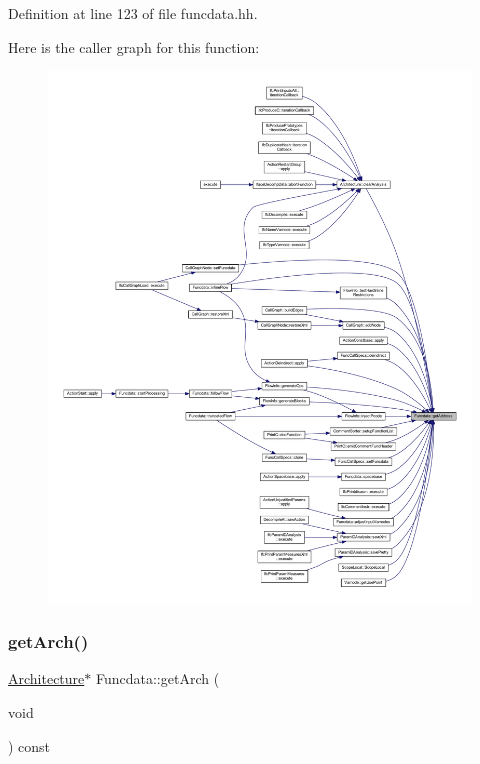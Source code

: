 Definition at line 123 of file funcdata.\+hh.

Here is the caller graph for this function\+:
\nopagebreak
\begin{figure}[H]
\begin{center}
\leavevmode
\includegraphics[width=350pt]{class_funcdata_ae3357db0b73196679a798903f28cd798_icgraph}
\end{center}
\end{figure}
\mbox{\label{class_funcdata_a47b9d753da3c1caf025981ced51c1e96}} 
\subsubsection{\texorpdfstring{getArch()}{getArch()}}
{\footnotesize\ttfamily \mbox{\hyperlink{class_architecture}{Architecture}}$\ast$ Funcdata\+::get\+Arch (\begin{DoxyParamCaption}\item[{void}]{ }\end{DoxyParamCaption}) const\hspace{0.3cm}{\ttfamily [inline]}}



